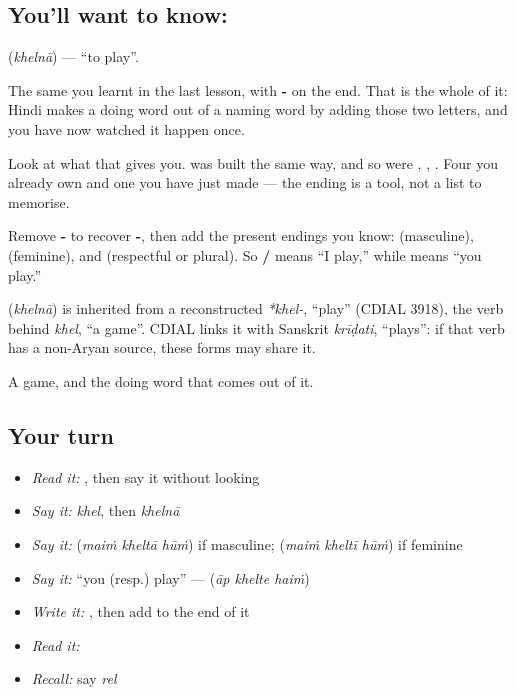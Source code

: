 \subsection*{You'll want to know: }
\textbf{} (\emph{khelnā}) — \textquotedblleft{}to play\textquotedblright{}.

The same  you learnt in the last lesson, with \textbf{-} on the end. That is the whole of it: Hindi makes a doing word out of a naming word by adding those two letters, and you have now watched it happen once.

Look at what that gives you. \textbf{} was built the same way, and so were \textbf{}, \textbf{}, \textbf{}. Four you already own and one you have just made — the ending is a tool, not a list to memorise.

Remove \textbf{-} to recover \textbf{-}, then add the present endings you know: \textbf{} (masculine), \textbf{} (feminine), and \textbf{} (respectful \textbf{} or plural). So \textbf{   /   } means \textquotedblleft{}I play,\textquotedblright{} while \textbf{  } means \textquotedblleft{}you play.\textquotedblright{}

\begin{cousinweb}
\textbf{} (\emph{khelnā}) is inherited from a reconstructed \emph{*khel-}, \textquotedblleft{}play\textquotedblright{} (CDIAL 3918), the verb behind \emph{khel}, \textquotedblleft{}a game\textquotedblright{}. CDIAL links it with Sanskrit \emph{krīḍati}, \textquotedblleft{}plays\textquotedblright{}: if that verb has a non-Aryan source, these forms may share it.
\end{cousinweb}

\begin{grammarlens}[title={What you've built}]
A game, and the doing word that comes out of it.
\end{grammarlens}

\subsection*{Your turn}
\begin{itemize}
\raggedright
  \item \emph{Read it:} \textbf{}, then say it without looking
  \item \emph{Say it:} \emph{khel}, then \emph{khelnā}
  \item \emph{Say it:} \textbf{  } (\emph{maiṁ kheltā hūṁ}) if masculine; \textbf{  } (\emph{maiṁ kheltī hūṁ}) if feminine
  \item \emph{Say it:} \textquotedblleft{}you (resp.) play\textquotedblright{} — \textbf{  } (\emph{āp khelte haiṁ})
  \item \emph{Write it:} , then add  to the end of it
  \item \emph{Read it:} \textbf{}
  \item \emph{Recall:} say \emph{rel}
\end{itemize}

